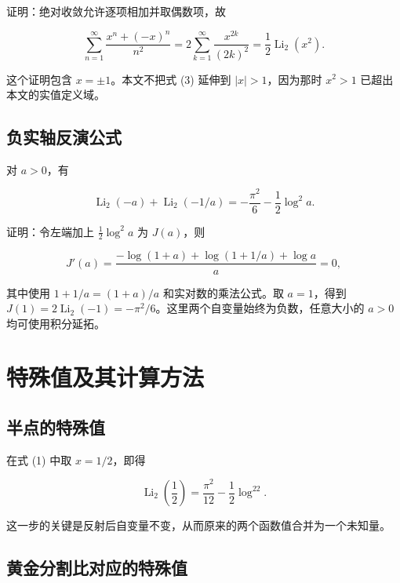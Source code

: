 \documentclass[11pt,a4paper]{article}
\begin{document}
证明：绝对收敛允许逐项相加并取偶数项，故

\[
\sum_{n=1}^{\infty}\frac{x^n+(-x)^n}{n^2}
=2\sum_{k=1}^{\infty}\frac{x^{2k}}{(2k)^2}
=\frac12\operatorname{Li}_2(x^2).
\]

这个证明包含 \(x=\pm1\)。本文不把式 (3) 延伸到 \(|x|>1\)，因为那时 \(x^2>1\) 已超出本文的实值定义域。

\hypertarget{ux8d1fux5b9eux8f74ux53cdux6f14ux516cux5f0f}{%
\subsection{负实轴反演公式}\label{ux8d1fux5b9eux8f74ux53cdux6f14ux516cux5f0f}}

对 \(a>0\)，有

\begin{equation}
\operatorname{Li}_2(-a)+\operatorname{Li}_2(-1/a)
=-\frac{\pi^2}{6}-\frac12\log^2a.
\tag{4}
\end{equation}

证明：令左端加上 \(\tfrac12\log^2a\) 为 \(J(a)\)，则

\[
J'(a)=\frac{-\log(1+a)+\log(1+1/a)+\log a}{a}=0,
\]

其中使用 \(1+1/a=(1+a)/a\) 和实对数的乘法公式。取 \(a=1\)，得到 \(J(1)=2\operatorname{Li}_2(-1)=-\pi^2/6\)。这里两个自变量始终为负数，任意大小的 \(a>0\) 均可使用积分延拓。

\hypertarget{ux7279ux6b8aux503cux53caux5176ux8ba1ux7b97ux65b9ux6cd5}{%
\section{特殊值及其计算方法}\label{ux7279ux6b8aux503cux53caux5176ux8ba1ux7b97ux65b9ux6cd5}}

\hypertarget{ux534aux70b9ux7684ux7279ux6b8aux503c}{%
\subsection{半点的特殊值}\label{ux534aux70b9ux7684ux7279ux6b8aux503c}}

在式 (1) 中取 \(x=1/2\)，即得

\begin{equation}
\operatorname{Li}_2\!\left(\frac12\right)
=\frac{\pi^2}{12}-\frac12\log^22.
\tag{5}
\end{equation}

这一步的关键是反射后自变量不变，从而原来的两个函数值合并为一个未知量。

\hypertarget{ux9ec4ux91d1ux5206ux5272ux6bd4ux5bf9ux5e94ux7684ux7279ux6b8aux503c}{%
\subsection{黄金分割比对应的特殊值}\label{ux9ec4ux91d1ux5206ux5272ux6bd4ux5bf9ux5e94ux7684ux7279ux6b8aux503c}}
\end{document}
